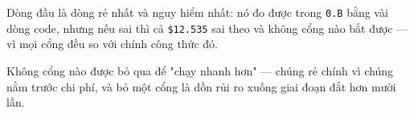 \documentclass[11pt,a4paper]{article}
\begin{document}
Dòng đầu là dòng rẻ nhất và nguy hiểm nhất: nó đo được trong \texttt{0.B} bằng vài dòng code, nhưng
nếu sai thì cả \texttt{\$12.535} sai theo và không cổng nào bắt được — vì mọi cổng đều so với chính
công thức đó.

Không cổng nào được bỏ qua để "chạy nhanh hơn" — chúng rẻ chính vì chúng nằm trước chi phí,
và bỏ một cổng là dồn rủi ro xuống giai đoạn đắt hơn mười lần.
\end{document}
